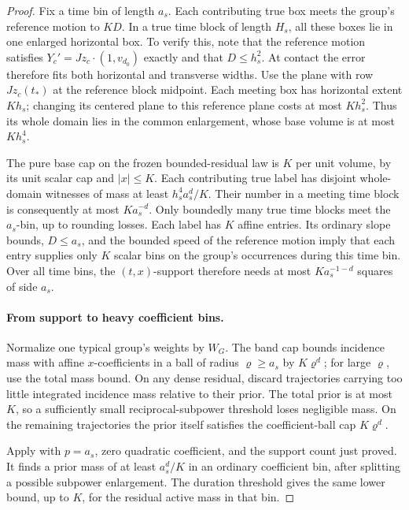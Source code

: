 \begin{proof}
Fix a time bin of length \(a_s\).  Each contributing true box
meets the group's reference motion to \(KD\).  In a true time
block of length \(H_s\), all these boxes lie in one enlarged
horizontal box.  To verify this, note that the reference motion
satisfies \(Y_c'=Jz_c\cdot(1,v_{d_0})\) exactly and that
\(D\le h_s^2\).  At contact the error therefore fits both
horizontal and transverse widths.  Use the plane with row
\(Jz_c(t_*)\) at the reference block midpoint.  Each meeting
box has horizontal extent \(Kh_s\); changing its centered plane
to this reference plane costs at most \(Kh_s^2\).  Thus its
whole domain lies in the common enlargement, whose base volume is
at most \(Kh_s^4\).

The pure base cap on the frozen bounded-residual law is \(K\)
per unit volume, by its unit scalar cap and \(|x|\le K\).
Each contributing true label has disjoint whole-domain witnesses
of mass at least \(h_s^4a_s^d/K\).  Their number in a meeting
time block is consequently at most \(Ka_s^{-d}\).
Only boundedly many true time blocks meet the \(a_s\)-bin,
up to rounding losses.  Each label has \(K\) affine entries.
Its ordinary slope bounds, \(D\le a_s\), and the bounded
speed of the reference motion imply that each entry supplies only
\(K\) scalar bins on the group's occurrences during this time
bin.  Over all time bins, the \((t,x)\)-support therefore needs
at most \(Ka_s^{-1-d}\) squares of side \(a_s\).

\paragraph{From support to heavy coefficient bins.}
Normalize one typical group's weights by \(W_G\).  The band cap
bounds incidence mass with affine \(x\)-coefficients in a ball
of radius \(\varrho\ge a_s\) by \(K\varrho^d\); for large
\(\varrho\), use the total mass bound.  On any dense residual,
discard trajectories carrying too little integrated incidence mass
relative to their prior.  The total prior is at most \(K\), so
a sufficiently small reciprocal-subpower threshold loses negligible
mass.  On the remaining trajectories the prior itself satisfies the
coefficient-ball cap \(K\varrho^d\).

Apply  with \(p=a_s\), zero quadratic
coefficient, and the support count just proved.  It finds a prior
mass of at least \(a_s^d/K\) in an ordinary coefficient bin,
after splitting a possible subpower enlargement.  The duration
threshold gives the same lower bound, up to \(K\), for the
residual active mass in that bin.


\end{proof}
